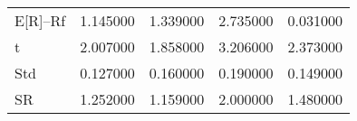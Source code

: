 \begin{tabular}{lrrrr}
\toprule
\midrule
E[R]--Rf & 1.145000 & 1.339000 & 2.735000 & 0.031000 \\
t & 2.007000 & 1.858000 & 3.206000 & 2.373000 \\
Std & 0.127000 & 0.160000 & 0.190000 & 0.149000 \\
SR & 1.252000 & 1.159000 & 2.000000 & 1.480000 \\
\bottomrule
\end{tabular}

